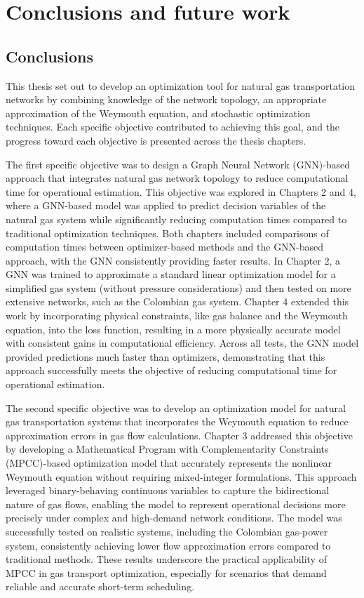 \chapter{Conclusions and future work}

\section{Conclusions}

This thesis set out to develop an optimization tool for natural gas transportation networks by combining knowledge of the network topology, an appropriate approximation of the Weymouth equation, and stochastic optimization techniques. Each specific objective contributed to achieving this goal, and the progress toward each objective is presented across the thesis chapters.

The first specific objective was to design a Graph Neural Network (GNN)-based approach that integrates natural gas network topology to reduce computational time for operational estimation. This objective was explored in Chapters 2 and 4, where a GNN-based model was applied to predict decision variables of the natural gas system while significantly reducing computation times compared to traditional optimization techniques. Both chapters included comparisons of computation times between optimizer-based methods and the GNN-based approach, with the GNN consistently providing faster results. In Chapter 2, a GNN was trained to approximate a standard linear optimization model for a simplified gas system (without pressure considerations) and then tested on more extensive networks, such as the Colombian gas system. Chapter 4 extended this work by incorporating physical constraints, like gas balance and the Weymouth equation, into the loss function, resulting in a more physically accurate model with consistent gains in computational efficiency. Across all tests, the GNN model provided predictions much faster than optimizers, demonstrating that this approach successfully meets the objective of reducing computational time for operational estimation.


The second specific objective was to develop an optimization model for natural gas transportation systems that incorporates the Weymouth equation to reduce approximation errors in gas flow calculations. Chapter 3 addressed this objective by developing a Mathematical Program with Complementarity Constraints (MPCC)-based optimization model that accurately represents the nonlinear Weymouth equation without requiring mixed-integer formulations. This approach leveraged binary-behaving continuous variables to capture the bidirectional nature of gas flows, enabling the model to represent operational decisions more precisely under complex and high-demand network conditions. The model was successfully tested on realistic systems, including the Colombian gas-power system, consistently achieving lower flow approximation errors compared to traditional methods. These results underscore the practical applicability of MPCC in gas transport optimization, especially for scenarios that demand reliable and accurate short-term scheduling.



